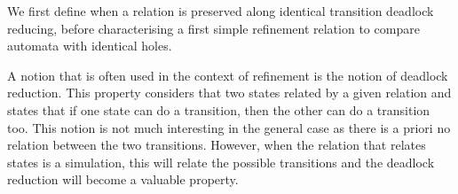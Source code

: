 \documentclass[runningheads]{llncs}
\begin{document}

%
%




We first define when a relation is preserved along identical transition deadlock reducing, before characterising a first simple refinement relation  to compare automata with identical holes.

A notion that is often used in the context of refinement is the notion of deadlock reduction. This property considers that two states related by a given relation and states that if one state can do a transition, then the other can do a transition too. This notion is not much interesting in the general case as there is a priori no relation between the two transitions. However, when the relation that relates states is a simulation, this will relate the possible transitions and the deadlock reduction will become a valuable property.
%
\end{document}
